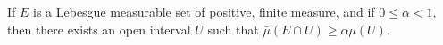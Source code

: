 If $E$ is a Lebesgue measurable set of positive, finite measure, and if $0 \leq \alpha < 1$, then there exists an open interval $U$ such that $\bar{\mu}(E \cap U) \geq \alpha \mu(U)$.
